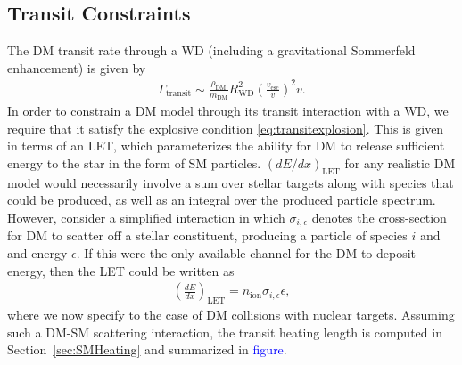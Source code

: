 \documentclass[twocolumn,showpacs,preprintnumbers,amsmath,amssymb,prd]{revtex4}
\def\r{\right)}
\def\l{\left(}
\begin{document}
\subsection{Transit Constraints}
\label{sec:TransitConstraints}

The DM transit rate through a WD (including a gravitational Sommerfeld enhancement) is given by
\begin{align}
\Gamma_\text{transit} \sim \frac{\rho_{\text{DM}}}{m_\text{DM}} R_\text{WD}^2 \l\frac{v_\text{esc}}{v}\r^2 v.
\label{eq:TransitFluxCondition}
\end{align}
In order to constrain a DM model through its transit interaction with a WD, we require that it satisfy the explosive condition \eqref{eq:transitexplosion}. 
This is given in terms of an LET, which parameterizes the ability for DM to release sufficient energy to the star in the form of SM particles.
$(dE/dx)_\text{LET}$ for any realistic DM model would necessarily involve a sum over stellar targets along with species that could be produced, as well as an integral over the produced particle spectrum.
However, consider a simplified interaction in which $\sigma_{i,\epsilon}$ denotes the cross-section for DM to scatter off a stellar constituent, producing a particle of species $i$ and and energy $\epsilon$.
If this were the only available channel for the DM to deposit energy, then the LET could be written as
\begin{align}
\label{eq:schematicLET}
  \left( \frac{d E}{d x} \right)_\text{LET} = n_\text{ion} \sigma_{i,\epsilon} \epsilon,
\end{align}
where we now specify to the case of DM collisions with nuclear targets. 
Assuming such a DM-SM scattering interaction, the transit heating length is computed in Section~\ref{sec:SMHeating} and summarized in \textcolor{blue}{figure}. 
\end{document}
